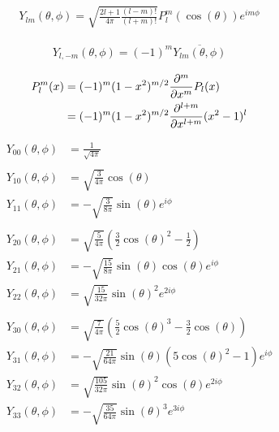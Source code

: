 
\begin{align*}
	Y_{lm}(\theta, \phi) = \sqrt{\frac{2l+1}{4\pi} \frac{(l-m)!}{(l+m)!}} P_l^m(\cos(\theta)) e^{im\phi}
\end{align*}

\begin{align*}
	Y_{l,-m}(\theta, \phi) = (-1)^m \overline{Y_{lm}(\theta, \phi)}
\end{align*}

\begin{align*}
	P_l^m(x) &= (-1)^m (1-x^2)^{m/2} \frac{\partial^m}{\partial x^m} P_l(x) \\
			 &= (-1)^m (1-x^2)^{m/2} \frac{\partial^{l+m}}{\partial x^{l+m}} (x^2-1)^l
\end{align*}

\begin{align*}
	Y_{00}(\theta, \phi) &=%
		\frac{1}{\sqrt{4\pi}} \\
	\\
	Y_{10}(\theta, \phi) &=%
		\sqrt{\frac{3}{4\pi}} \cos(\theta) \\
	Y_{11}(\theta, \phi) &=%
		-\sqrt{\frac{3}{8\pi}} \sin(\theta) e^{i\phi} \\
	\\
	Y_{20}(\theta, \phi) &=%
		\sqrt{\frac{5}{4\pi}} (\tfrac{3}{2}\cos(\theta)^2-\tfrac{1}{2}) \\
	Y_{21}(\theta, \phi) &=%
		-\sqrt{\frac{15}{8\pi}} \sin(\theta) \cos(\theta) e^{i\phi} \\
	Y_{22}(\theta, \phi) &=%
		\sqrt{\frac{15}{32\pi}} \sin(\theta)^2 e^{2i\phi} \\
	\\
	Y_{30}(\theta, \phi) &=%
		\sqrt{\frac{7}{4\pi}} (\tfrac{5}{2}\cos(\theta)^3-\tfrac{3}{2}\cos(\theta)) \\
	Y_{31}(\theta, \phi) &=%
		-\sqrt{\frac{21}{64\pi}} \sin(\theta) (5\cos(\theta)^2-1) e^{i\phi} \\
	Y_{32}(\theta, \phi) &=%
		\sqrt{\frac{105}{32\pi}} \sin(\theta)^2 \cos(\theta) e^{2i\phi} \\
	Y_{33}(\theta, \phi) &=%
		-\sqrt{\frac{35}{64\pi}} \sin(\theta)^3 e^{3i\phi} \\
\end{align*}
